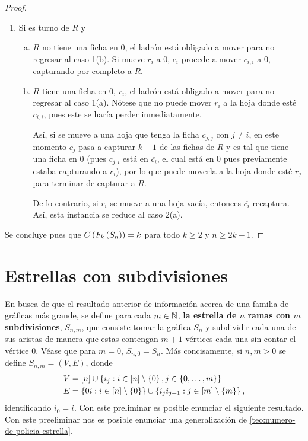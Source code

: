 \begin{proof}
\begin{enumerate}
        \item Si es turno de $R$ y
        \begin{enumerate}[(a)]
            \item $R$ no tiene una ficha en $0$, el ladr\'on est\'a obligado a
            mover para no regresar al caso 1(b). Si mueve $r_i$ a $0$, $c_i$
            procede a mover $c_{i,i}$ a $0$, capturando por completo a $R$.
            
            \item $R$ tiene una ficha en $0$, $r_i$, el ladr\'on est\'a obligado
            a mover para no regresar al caso 1(a). N\'otese que no puede mover
            $r_i$ a la hoja donde est\'e $c_{i,i}$, pues este se har\'ia perder
            inmediatamente.
            
            As\'i, si se mueve a una hoja que tenga la ficha $c_{j,j}$ con
            $j\neq i$, en este momento $c_j$ pasa a capturar $k-1$ de las fichas
            de $R$ y es tal que tiene una ficha en $0$ (pues $c_{j,i}$ est\'a en
            $\overline{c_i}$, el cual est\'a en $0$ pues previamente estaba
            capturando a $r_i$), por lo que puede moverla a la hoja donde est\'e
            $r_j$ para terminar de capturar a $R$.

            De lo contrario, si $r_i$ se mueve a una hoja vac\'ia, entonces
            $\overline{c_i}$ recaptura. As\'i, esta instancia se reduce al caso
            2(a).
        \end{enumerate}
    \end{enumerate}
    Se concluye pues que $C\left( F_k\left( S_n\right)\right)=k$ para todo $k\geq 2$ y
    $n\geq 2k-1$.
    
\end{proof}

\section{Estrellas con subdivisiones}

En busca de que el resultado anterior de informaci\'on acerca de una familia de
gr\'aficas m\'as grande, se define para cada $m\in \mathbb{N}$, \textbf{la
estrella de $n$ ramas con $m$ subdivisiones}, $S_{n,m}$, que consiste tomar la
gr\'afica $S_n$ y subdividir cada una de sus aristas de manera que estas
contengan $m+1$ v\'ertices cada una sin contar el v\'ertice $0$. V\'ease que
para $m=0$, $S_{n,0}=S_n$. M\'as concisamente, si $n,m > 0$ se define
$S_{n,m}=(V,E)$, donde
\begin{align*}
    V &=\left[ n\right]\cup\left\{ i_j: i\in\left[ n\right]\setminus \left\{ 0\right\} , j\in \left\{ 0,\dots, m\right\}\right\} \\
    E &=\left\{ 0i : i\in \left[ n\right]\setminus\left\{ 0\right\}\right\} \cup \left\{ i_ji_{j+1}:j\in\left[ m\right]\setminus\left\{ m\right\}\right\},
\end{align*}
identificando $i_0=i$. Con este preliminar es posible enunciar el siguiente
resultado. Con este preeliminar nos es posible enunciar una generalizaci\'on de
\cref{teo:numero-de-policia-estrella}.

